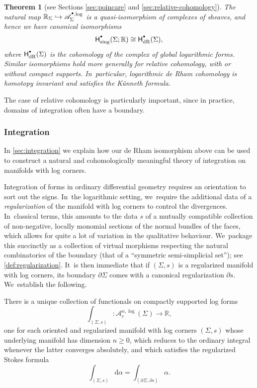 \documentclass[10pt]{amsart}
\let\oldbullet\bullet
\renewcommand{\bullet}{{\raisebox{1pt}{$\scriptscriptstyle\oldbullet$}}}
\newcommand\hto{\mathrel{\lhook\joinrel\to}}
\newtheorem{theorem}{Theorem}[section]
\theoremstyle{definition}
\theoremstyle{remark}
\let\defn\emph
\newcommand{\RR}{\mathbb{R}}
\renewcommand{\ge}{\geqslant}
\newcommand{\dd}{\mathrm{d}}
\newcommand{\cAlog}[2][\bullet]{\mathscr{A}^{#1,\log}_{#2}}
\newcommand{\Alogc}[2][\bullet]{\mathscr{A}^{#1,\log}_c(#2)}
\newcommand{\Sig}{\Sigma}
\newcommand{\bdSig}[1][]{\partial^{#1}\Sigma}
\newcommand{\HdR}[2][\bullet]{\mathsf{H}_{\mathrm{dR}}^{#1}(#2)}
\begin{document}
\begin{theorem}[see Sections \ref{sec:poincare} and \ref{sec:relative-cohomology}]\label{thm:intro-deRham}
The natural map $\RR_{\Sig} \hto \cAlog{\Sig}$ is a quasi-isomorphism of complexes of sheaves, and hence we have canonical isomorphisms
\[
\mathsf{H}^\bullet_{\mathrm{sing}}(\Sig;\RR) \cong \HdR{\Sig},
\]
where $\HdR{\Sig}$ is the cohomology of the complex of global logarithmic forms. Similar isomorphisms hold more generally for relative cohomology, with or without compact supports. In~particular, logarithmic de Rham cohomology is homotopy invariant and satisfies the Künneth formula.
\end{theorem}
The case of relative cohomology is particularly important, since in practice, domains of integration often have a boundary.

\subsubsection{Integration}

In \autoref{sec:integration} we explain how our de Rham isomorphism above can be used to construct a natural and cohomologically meaningful theory of integration on manifolds with log corners.

Integration of forms in ordinary differential geometry requires an orientation to sort out the signs. In~the logarithmic setting, we~require the additional data of a \defn{regularization} of the manifold with log corners to control the divergences. In~classical terms, this amounts to the data $s$ of a mutually compatible collection of non-negative, locally monomial sections of the normal bundles of the faces, which allows for quite a lot of variation in the qualitative behaviour. We~package this succinctly as a collection of virtual morphisms respecting the natural combinatorics of the boundary (that of a ``symmetric semi-simplicial set''); see \autoref{def:regularization}. It~is then immediate that if $(\Sig,s)$ is a regularized manifold with log corners, its boundary $\partial \Sig$ comes with a canonical regularization $\partial s$. We~establish the following.


\begin{theoremdefn}
There is a unique collection of functionals on compactly supported log forms
\[
\int_{(\Sig,s)} \colon \Alogc[n]{\Sig} \to \RR,
\]
one for each oriented and regularized manifold with log corners $(\Sig,s)$ whose underlying manifold has dimension $n \ge 0$, which reduces to the ordinary integral whenever the latter converges absolutely, and which satisfies the regularized Stokes formula
\[
\int_{(\Sig,s)}\dd \alpha = \int_{(\bdSig,\partial s)}\alpha.
\]
\end{theoremdefn}
\end{document}
